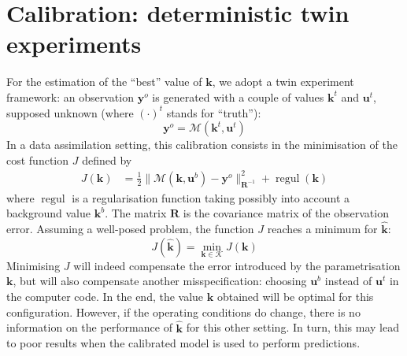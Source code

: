 \documentclass[npg,manuscript]{copernicus}
\newcommand{\yobs}{\mathbf{y}^o}
\begin{document}
\section{Calibration: deterministic twin experiments}
\label{sec:deterministic}


For the estimation of the ``best'' value of $\mathbf{k}$, we adopt a twin experiment framework:
an observation $\yobs$ is generated with a couple of values $\mathbf{k}^t$ and $\mathbf{u}^t$, supposed unknown (where ${(\cdot)}^t$ stands for ``truth''):
\begin{equation}
  \yobs = \mathcal{M}(\mathbf{k}^t, \mathbf{u}^t)
\end{equation}
In a data assimilation setting, this calibration consists in the minimisation of the cost function $J$ defined by
\begin{align}
  \label{eq:def_cost_fun}
  J(\mathbf{k}) & = \frac12\|\mathcal{M}(\mathbf{k},\mathbf{u}^b) - \yobs \|_{\mathbf{R}^{-1}}^2 + \mathop{\mathrm{regul}}(\mathbf{k})%
\end{align}
where $\mathop{\mathrm{regul}}$ is a regularisation function taking possibly into account a background value $\mathbf{k}^b$. The matrix $\mathbf{R}$ is the covariance matrix of the observation error. Assuming a well-posed problem, the function $J$ reaches a minimum for $\hat{\mathbf{k}}$:
\begin{equation}
  \label{eq:khat_def}
  J(\hat{\mathbf{k}}) = \min_{\mathbf{k} \in \mathcal{K}} J(\mathbf{k})
\end{equation}
Minimising $J$ will indeed compensate the error introduced by the parametrisation $\mathbf{k}$, but will also compensate another misspecification: choosing $\mathbf{u}^b$ instead of $\mathbf{u}^t$ in the computer code.
In the end, the value $\hat{\mathbf{k}}$ obtained will be optimal for this configuration. However, if the operating conditions do change, there is no information on the performance of $\hat{\mathbf{k}}$ for this other setting.
In turn, this may lead to poor results when the calibrated model is used to perform predictions.



\end{document}
